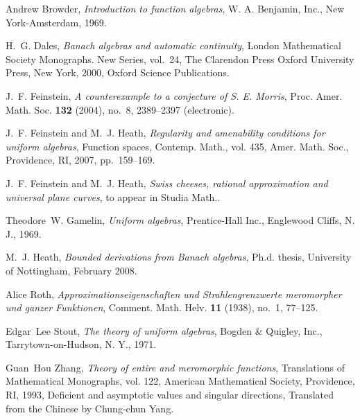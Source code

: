 \documentclass{strippedproc-l}
\theoremstyle{definition}
\theoremstyle{remark}
\numberwithin{equation}{section}
\begin{document}
\providecommand{\MRhref}[2]{%
  \href{http://www.ams.org/mathscinet-getitem?mr=#1}{#2}
}
\providecommand{\href}[2]{#2}
\begin{thebibliography}{10}

Andrew Browder, \emph{Introduction to function algebras}, W. A. Benjamin, Inc.,
  New York-Amsterdam, 1969. 

H.~G. Dales, \emph{Banach algebras and automatic continuity}, London
  Mathematical Society Monographs. New Series, vol.~24, The Clarendon Press
  Oxford University Press, New York, 2000, Oxford Science Publications.

J.~F. Feinstein, \emph{A counterexample to a conjecture of {S}. {E}. {M}orris},
  Proc. Amer. Math. Soc. \textbf{132} (2004), no.~8, 2389--2397 (electronic).

J.~F. Feinstein and M.~J. Heath, \emph{Regularity and amenability conditions
  for uniform algebras}, Function spaces, Contemp. Math., vol. 435, Amer. Math.
  Soc., Providence, RI, 2007, pp.~159--169. 

J.~F. Feinstein and M.~J. Heath, \emph{Swiss cheeses, rational approximation
  and universal plane curves}, to appear in Studia Math..

Theodore~W. Gamelin, \emph{Uniform algebras}, Prentice-Hall Inc., Englewood
  Cliffs, N. J., 1969. 

M.~J. Heath, \emph{Bounded derivations from {B}anach algebras}, Ph.d. thesis,
  University of Nottingham, February 2008.

Alice Roth, \emph{Approximationseigenschaften und {S}trahlengrenzwerte
  meromorpher und ganzer {F}unktionen}, Comment. Math. Helv. \textbf{11}
  (1938), no.~1, 77--125. 

Edgar~Lee Stout, \emph{The theory of uniform algebras}, Bogden \& Quigley,
  Inc., Tarrytown-on-Hudson, N. Y., 1971. 

Guan~Hou Zhang, \emph{Theory of entire and meromorphic functions}, Translations
  of Mathematical Monographs, vol. 122, American Mathematical Society,
  Providence, RI, 1993, Deficient and asymptotic values and singular
  directions, Translated from the Chinese by Chung-chun Yang. 

\end{thebibliography}
\end{document}
